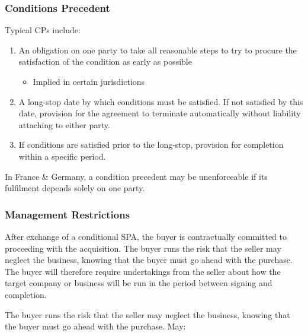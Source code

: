 \documentclass[
]{article}
\providecommand{\tightlist}{%
  \setlength{\itemsep}{0pt}\setlength{\parskip}{0pt}}
\begin{document}
\hypertarget{conditions-precedent-1}{%
\subsubsection{Conditions Precedent}\label{conditions-precedent-1}}

Typical CPs include:

\begin{enumerate}
\def\labelenumi{\arabic{enumi}.}
\tightlist
\item
  An obligation on one party to take all reasonable steps to try to
  procure the satisfaction of the condition as early as possible

  \begin{itemize}
  \tightlist
  \item
    Implied in certain jurisdictions
  \end{itemize}
\item
  A long-stop date by which conditions must be satisfied. If not
  satisfied by this date, provision for the agreement to terminate
  automatically without liability attaching to either party.
\item
  If conditions are satisfied prior to the long-stop, provision for
  completion within a specific period.
\end{enumerate}

In France \& Germany, a condition precedent may be unenforceable if its
fulfilment depends solely on one party.

\hypertarget{management-restrictions}{%
\subsubsection{Management Restrictions}\label{management-restrictions}}

After exchange of a conditional SPA, the buyer is contractually
committed to proceeding with the acquisition. The buyer runs the risk
that the seller may neglect the business, knowing that the buyer must go
ahead with the purchase. The buyer will therefore require undertakings
from the seller about how the target company or business will be run in
the period between signing and completion.

The buyer runs the risk that the seller may neglect the business,
knowing that the buyer must go ahead with the purchase. May:
\end{document}
